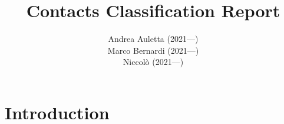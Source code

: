 \documentclass{article}
\title{Contacts Classification Report}
\author{Andrea Auletta (2021---)\\
        Marco Bernardi (2021---) \\
        Niccolò (2021---)}
\begin{document}
\maketitle
\section{Introduction}
\end{document}
